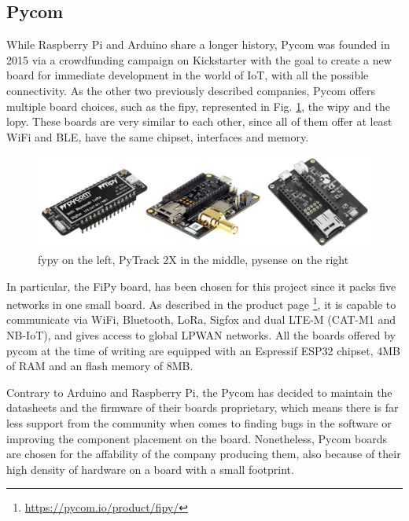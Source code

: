 		\subsection{Pycom}
			
			While Raspberry Pi and Arduino share a longer history, Pycom was founded in 2015 via a crowdfunding campaign on Kickstarter with the goal to create a new board for immediate development in the world of IoT, with all the possible connectivity.
			As the other two previously described companies, Pycom offers multiple board choices, such as the fipy, represented in Fig. \ref{img:pycom_board}, the wipy and the lopy.
			These boards are very similar to each other, since all of them offer at least WiFi and BLE, have the same chipset, interfaces and memory.
			
			\begin{figure}[H]
				\centering
				\includegraphics[width=\textwidth]{resources/img/chap3/pycom_board}
				\caption{fypy on the left, PyTrack 2X in the middle, pysense on the right}
				\label{img:pycom_board}
			\end{figure}	
			
			In particular, the FiPy board, has been chosen for this project since it packs five networks in one small board.
			As described in the product page \footnote{\url{https://pycom.io/product/fipy/}}, it is capable to communicate via WiFi, Bluetooth, LoRa, Sigfox and dual LTE-M (CAT-M1 and NB-IoT), and gives access to global LPWAN networks.
			All the boards offered by pycom at the time of writing are equipped with an Espressif ESP32 chipset, 4MB of RAM and an flash memory of 8MB.
			
			Contrary to Arduino and Raspberry Pi, the Pycom has decided to maintain the datasheets and the firmware of their boards proprietary, which means there is far less support from the community when comes to finding bugs in the software or improving the component placement on the board.
			Nonetheless, Pycom boards are chosen for the affability of the company producing them, also because of their high density of hardware on a board with a small footprint.
			

